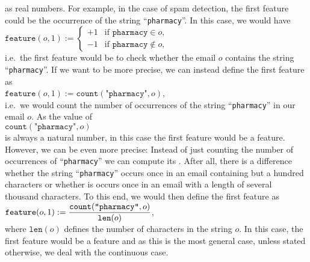 as real numbers.  For example, in the case of spam detection, the first feature
could be the occurrence of the string ``\texttt{pharmacy}''.  In this case, we would have
\\[0.2cm]
\hspace*{1.3cm}
$\texttt{feature}(o, 1) := \left\{
\begin{array}{ll}
  +1 & \mbox{if \ $\texttt{pharmacy}     \in o$,}      \\
  -1 & \mbox{if \ $\texttt{pharmacy} \not\in o$,}  
\end{array}\right.
$
\\[0.2cm]
i.e.~the first feature would be to check whether the email $o$ contains the string ``\texttt{pharmacy}''.  
If we want to be more precise, we can instead define the first feature as
\\[0.2cm]
\hspace*{1.3cm}
$\texttt{feature}(o, 1) := \mathtt{count}(\texttt{"pharmacy"}, o)$,
\\[0.2cm]
i.e.~we would count the number of occurrences of the string ``\texttt{pharmacy}'' in our email $o$.   
As the value of
\\[0.2cm]
\hspace*{1.3cm}
 $\mathtt{count}(\texttt{"pharmacy"}, o)$ 
\\[0.2cm]
is always a natural number, in this case the first feature would be a
  feature.  However, we can be even more precise: Instead of just counting the number of occurrences of
 ``\texttt{pharmacy}'' we can compute its .  
 After all, there is a difference whether the
 string ``\texttt{pharmacy}'' occurs once in an email  containing but a hundred characters or whether is occurs
 once in an email with a length of several thousand  characters.  To this end, we would then define the first feature as
\\[0.2cm]
\hspace*{1.3cm}
$\displaystyle \texttt{feature}(o, 1) := \frac{\mathtt{count}(\texttt{"pharmacy"}, o)}{\mathtt{len}(o)}$, 
\\[0.2cm]
where $\mathtt{len}(o)$ defines the number of characters in the string $o$.  In this case, the first feature would be a
 feature and as this is the most general case, unless stated otherwise, we deal with the continuous
case. 

